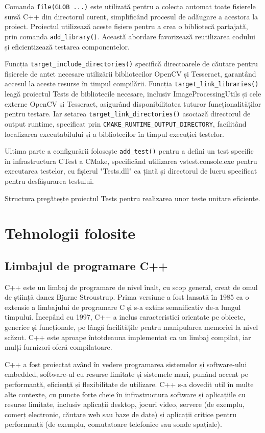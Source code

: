 \documentclass[a4paper,12pt]{report}
\begin{document}
Comanda \texttt{file(GLOB ...)} este utilizată pentru a colecta automat toate fișierele sursă C++ din directorul curent, simplificând procesul de adăugare a acestora la proiect. Proiectul utilizează aceste fișiere pentru a crea o bibliotecă partajată, prin comanda \texttt{add\_library()}. Această abordare favorizează reutilizarea codului și eficientizează testarea componentelor.

Funcția \texttt{target\_include\_directories()} specifică directoarele de căutare pentru fișierele de antet necesare utilizării bibliotecilor OpenCV și Tesseract, garantând accesul la aceste resurse în timpul compilării. Funcția  \texttt{target\_link\_libraries()} leagă proiectul Tests de bibliotecile necesare, inclusiv ImageProcessingUtils și cele externe OpenCV și Tesseract, asigurând disponibilitatea tuturor funcționalităților pentru testare. Iar setarea \texttt{target\_link\_directories()} asociază directorul de output runtime, specificat prin \texttt{CMAKE\_RUNTIME\_OUTPUT\_DIRECTORY}, facilitând localizarea executabilului și a bibliotecilor în timpul execuției testelor.

Ultima parte a configurării folosește \texttt{add\_test()} pentru a defini un test specific în infrastructura CTest a CMake, specificând utilizarea vstest.console.exe pentru executarea testelor, cu fișierul "Tests.dll" ca țintă și directorul de lucru specificat pentru desfășurarea testului.

Structura pregătește proiectul Tests pentru realizarea unor teste unitare eficiente.

\chapter{Tehnologii folosite}
\section{Limbajul de programare C++}
C++ este un limbaj de programare de nivel înalt, cu scop general, creat de omul de știință danez Bjarne Stroustrup. Prima versiune a fost lansată în 1985 ca o extensie a limbajului de programare C și s-a extins semnificativ de-a lungul timpului. Începând cu 1997, C++ a inclus caracteristici orientate pe obiecte, generice și funcționale, pe lângă facilitățile pentru manipularea memoriei la nivel scăzut. C++ este aproape întotdeauna implementat ca un limbaj compilat, iar mulți furnizori oferă compilatoare.

C++ a fost proiectat având în vedere programarea sistemelor și software-ului embedded, software-ul cu resurse limitate și sistemele mari, punând accent pe performanță, eficiență și flexibilitate de utilizare. C++ s-a dovedit util în multe alte contexte, cu puncte forte cheie în infrastructura software și aplicațiile cu resurse limitate, inclusiv aplicații desktop, jocuri video, servere (de exemplu, comerț electronic, căutare web sau baze de date) și aplicații critice pentru performanță (de exemplu, comutatoare telefonice sau sonde spațiale).
\end{document}
